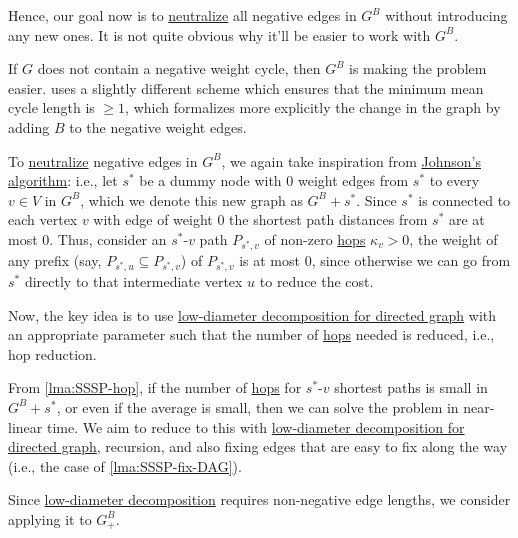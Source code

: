 Hence, our goal now is to \hyperref[def:neutralize]{neutralize} all negative edges in \(G^B\) without introducing any new ones. It is not quite obvious why it'll be easier to work with \(G^B\).

\begin{intuition}
	If \(G\) does not contain a negative weight cycle, then \(G^B\) is making the problem easier. \cite{bringmann2023negative} uses a slightly different scheme which ensures that the minimum mean cycle length is \(\geq 1\), which formalizes more explicitly the change in the graph by adding \(B\) to the negative weight edges.
\end{intuition}

To \hyperref[def:neutralize]{neutralize} negative edges in \(G^B\), we again take inspiration from \hyperref[prev:Johnson-algorithm]{Johnson's algorithm}: i.e., let \(s^{\ast} \) be a dummy node with \(0\) weight edges from \(s^{\ast} \) to every \(v \in V\) in \(G^B\), which we denote this new graph as \(G^B + s^{\ast} \). Since \(s^{\ast} \) is connected to each vertex \(v\) with edge of weight \(0\) the shortest path distances from \(s^{\ast} \) are at most \(0\). Thus, consider an \(s^{\ast} \)-\(v\) path \(P_{s^{\ast} , v}\) of non-zero \hyperref[not:hop]{hops} \(\kappa _v > 0\), the weight of any prefix (say, \(P_{s^{\ast} , u} \subseteq P_{s^{\ast} , v}\)) of \(P_{s^{\ast} , v}\) is at most \(0\), since otherwise we can go from \(s^{\ast} \) directly to that intermediate vertex \(u\) to reduce the cost.

Now, the key idea is to use \hyperref[thm:directed-LDD]{low-diameter decomposition for directed graph} with an appropriate parameter such that the number of \hyperref[not:hop]{hops} needed is reduced, i.e., hop reduction.

\begin{intuition}
	From \autoref{lma:SSSP-hop}, if the number of \hyperref[not:hop]{hops} for \(s^{\ast} \)-\(v\) shortest paths is small in \(G^B + s^{\ast} \), or even if the average is small, then we can solve the problem in near-linear time. We aim to reduce to this with \hyperref[thm:directed-LDD]{low-diameter decomposition for directed graph}, recursion, and also fixing edges that are easy to fix along the way (i.e., the case of \autoref{lma:SSSP-fix-DAG}).
\end{intuition}

Since \hyperref[thm:directed-LDD]{low-diameter decomposition} requires non-negative edge lengths, we consider applying it to \(G_{+}^B \).

